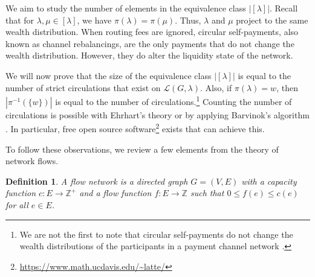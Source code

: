 \documentclass[10pt,twocolumn]{article}
\newtheorem{definition}{Definition}[section]
\begin{document}

We aim to study the number of elements in the equivalence class \( |[\lambda]| \).  
Recall that for \( \lambda, \mu \in [\lambda] \), we have \( \pi(\lambda) = \pi(\mu) \).  
Thus, \( \lambda \) and \( \mu \) project to the same wealth distribution.  
When routing fees are ignored, circular self-payments, also known as channel rebalancings, are the only payments that do not change the wealth distribution.  
However, they do alter the liquidity state of the network.  

We will now prove that the size of the equivalence class \( |[\lambda]| \) is equal to the number of strict circulations that exist on \( \mathcal{L}(G, \lambda) \).  
Also, if \( \pi(\lambda) = w \), then \( |\pi^{-1}(\{w\})| \) is equal to the number of circulations.\footnote{We are not the first to note that circular self-payments do not change the wealth distributions of the participants in a payment channel network \cite{piatkivskyi2018rebalancing}.}  
Counting the number of circulations is possible with Ehrhart's theory \cite{ehrhart1962polyhedra} or by applying Barvinok's algorithm \cite{barvinok1994polynomial}.  
In particular, free open source software\footnote{\url{https://www.math.ucdavis.edu/~latte/}} exists \cite{de2004effective} that can achieve this.  

To follow these observations, we review a few elements from the theory of network flows.  

\begin{definition}
A flow network is a directed graph \( G = (V, E) \) with a capacity function \( c: E \rightarrow \mathbb{Z}^+ \) and a flow function \( f: E \rightarrow \mathbb{Z} \) such that \( 0 \leq f(e) \leq c(e) \) for all \( e \in E \).
\end{definition}
\end{document}
